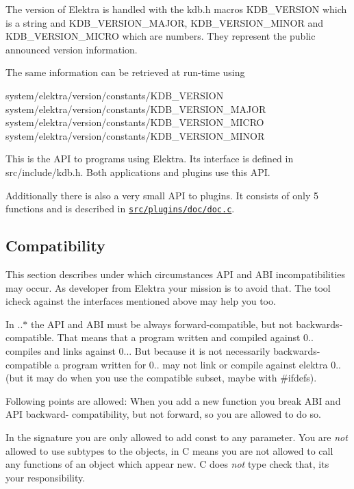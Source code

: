 The version of Elektra is handled with the kdb.\+h macros {\ttfamily K\+D\+B\+\_\+\+V\+E\+R\+S\+I\+ON} which is a string and {\ttfamily K\+D\+B\+\_\+\+V\+E\+R\+S\+I\+O\+N\+\_\+\+M\+A\+J\+OR}, {\ttfamily K\+D\+B\+\_\+\+V\+E\+R\+S\+I\+O\+N\+\_\+\+M\+I\+N\+OR} and {\ttfamily K\+D\+B\+\_\+\+V\+E\+R\+S\+I\+O\+N\+\_\+\+M\+I\+C\+RO} which are numbers. They represent the public announced version information.

The same information can be retrieved at run-\/time using


\begin{DoxyCode}
system/elektra/version/constants/KDB\_VERSION
system/elektra/version/constants/KDB\_VERSION\_MAJOR
system/elektra/version/constants/KDB\_VERSION\_MICRO
system/elektra/version/constants/KDB\_VERSION\_MINOR
\end{DoxyCode}


This is the A\+PI to programs using Elektra. Its interface is defined in src/include/kdb.h. Both applications and plugins use this A\+PI.

Additionally there is also a very small A\+PI to plugins. It consists of only 5 functions and is described in \href{/home/markus/Projekte/Elektra/current/src/plugins/doc/doc.c}{\tt src/plugins/doc/doc.\+c}.

\subsection*{Compatibility}

This section describes under which circumstances A\+PI and A\+BI incompatibilities may occur. As developer from Elektra your mission is to avoid that. The tool icheck against the interfaces mentioned above may help you too.

In {..$\ast$} the A\+PI and A\+BI must be always forward-\/compatible, but not backwards-\/compatible. That means that a program written and compiled against 0.. compiles and links against 0... But because it is not necessarily backwards-\/compatible a program written for 0.. may not link or compile against elektra 0.. (but it may do when you use the compatible subset, maybe with \#ifdefs).

Following points are allowed\+: When you add a new function you break A\+BI and A\+PI backward-\/ compatibility, but not forward, so you are allowed to do so.

In the signature you are only allowed to add const to any parameter. You are {\itshape not} allowed to use subtypes to the objects, in C means you are not allowed to call any functions of an object which appear new. C does {\itshape not} type check that, it\textquotesingle{}s your responsibility.


